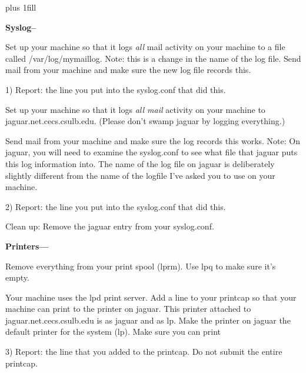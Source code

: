 
\rightskip=0pt plus 1fill

\parindent 0pt

{\bf Syslog--}

Set up your machine so that it logs {\it  all} mail activity 
on your machine to a file called {\ltt{}/var/log/mymaillog}.
Note: this is a change in the name of the log file.
Send mail from your machine and make sure the new log file records this.

1) Report: the line you put into the syslog.conf that did this.

Set up your machine so that it logs {\it all mail} activity 
on your machine to 
{\ltt{}jaguar.net.cecs.csulb.edu}.
(Please don't swamp jaguar by logging everything.)

Send mail from your machine and make sure the log records this works.
Note: On {\ltt{}jaguar}, you will need to examine the {\ltt{}syslog.conf}
to see what file that {\ltt{}jaguar} puts this log information into.
The name of the log file on jaguar is deliberately slightly different from
the name of the logfile I've asked you to use on your machine.

2) Report: the line you put into the syslog.conf that did this.

Clean up: Remove the {\ltt{}jaguar} entry from your {\ltt{}syslog.conf}.

{\bf Printers---}

Remove everything from your print spool ({\ltt{}lprm}).
Use {\ltt{}lpq} to make sure it's empty.

Your machine uses the lpd print server.
Add a line to your printcap so that your machine can
print to the printer on jaguar.
This printer attached to {\ltt{}jaguar.net.cecs.csulb.edu} is
as {\ltt{}jaguar} and as {\ltt{}lp}.
Make the printer on {\ltt{}jaguar} the default printer for the system 
({\ltt{}lp}).
Make sure you can print

3) Report: the line that you added to the printcap. 
Do not submit the entire printcap.



\bye

